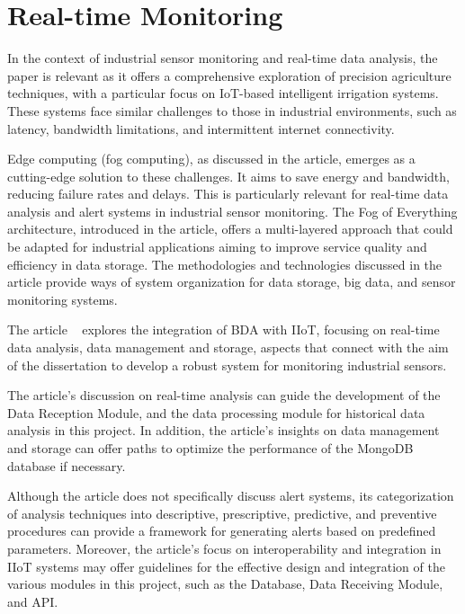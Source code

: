 \section{Real-time Monitoring}

In the context of industrial sensor monitoring and real-time data analysis, the paper \cite{shafi2019precision} is relevant as it offers a comprehensive exploration of precision agriculture techniques, with a particular focus on IoT-based intelligent irrigation systems. These systems face similar challenges to those in industrial environments, such as latency, bandwidth limitations, and intermittent internet connectivity.

Edge computing (fog computing), as discussed in the article, emerges as a cutting-edge solution to these challenges. It aims to save energy and bandwidth, reducing failure rates and delays. This is particularly relevant for real-time data analysis and alert systems in industrial sensor monitoring. The Fog of Everything architecture, introduced in the article, offers a multi-layered approach that could be adapted for industrial applications aiming to improve service quality and efficiency in data storage. The methodologies and technologies discussed in the article provide ways of system organization for data storage, big data, and sensor monitoring systems.

The article ~\cite{REHMAN} explores the integration of \gls{BDA} with \gls{IIoT}, focusing on real-time data analysis, data management and storage, aspects that connect with the aim of the dissertation to develop a robust system for monitoring industrial sensors.

The article's discussion on real-time analysis can guide the development of the Data Reception Module, and the data processing module for historical data analysis in this project. In addition, the article's insights on data management and storage can offer paths to optimize the performance of the MongoDB database if necessary.

Although the article does not specifically discuss alert systems, its categorization of analysis techniques into descriptive, prescriptive, predictive, and preventive procedures can provide a framework for generating alerts based on predefined parameters. Moreover, the article's focus on interoperability and integration in IIoT systems may offer guidelines for the effective design and integration of the various modules in this project, such as the Database, Data Receiving Module, and \gls{API}.

